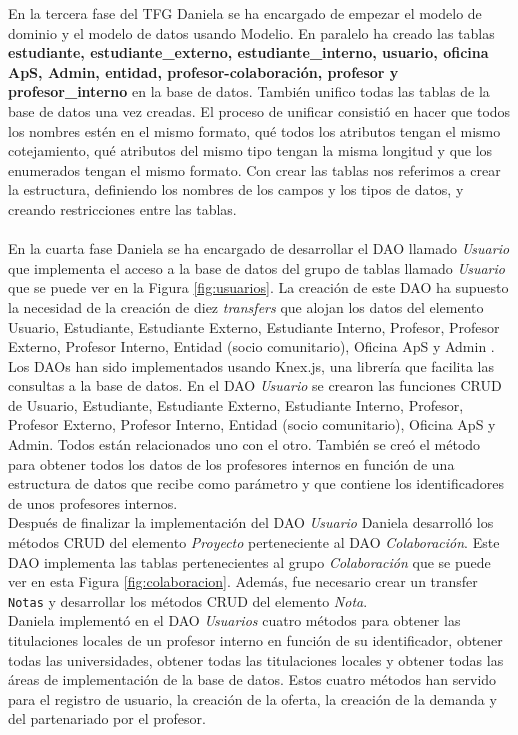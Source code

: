 \documentclass[11pt]{book}
\begin{document}
En la tercera fase del TFG Daniela se ha encargado de empezar el modelo de dominio y el modelo de datos usando Modelio. En paralelo ha creado las tablas \textbf{estudiante, estudiante\_externo, estudiante\_interno, usuario, oficina ApS, Admin, entidad, profesor-colaboración, profesor y profesor\_interno} en la base de datos. También unifico todas las tablas de la base de datos una vez creadas. El proceso de unificar consistió en hacer que todos los nombres estén en el mismo formato, qué todos los atributos tengan el mismo cotejamiento, qué atributos del mismo tipo tengan la misma longitud y que los enumerados tengan el mismo formato. Con crear las tablas nos referimos a crear la estructura, definiendo los nombres de los campos y los tipos de datos, y creando restricciones entre las tablas.\\\\
En la cuarta fase Daniela se ha encargado de desarrollar el DAO llamado \textit{Usuario} que implementa el acceso a la base de datos del grupo de tablas llamado \textit{Usuario} que se puede ver en la Figura \ref{fig:usuarios}. La creación de este DAO ha supuesto la necesidad de la creación de diez \textit{transfers} que alojan los datos del elemento Usuario, Estudiante, Estudiante Externo, Estudiante Interno, Profesor, Profesor Externo, Profesor Interno, Entidad (socio comunitario), Oficina ApS y Admin . Los DAOs han sido implementados usando Knex.js, una librería que facilita las consultas a la base de datos. En el DAO \textit{Usuario} se crearon las funciones CRUD de Usuario, Estudiante, Estudiante Externo, Estudiante Interno, Profesor, Profesor Externo, Profesor Interno, Entidad (socio comunitario), Oficina ApS y Admin. Todos están relacionados uno con el otro. También se creó el método para obtener todos los datos de los profesores internos en función de una estructura de datos que recibe como parámetro y que contiene los identificadores de unos profesores internos.\\
Después de finalizar la implementación del DAO \textit{Usuario} Daniela desarrolló los métodos CRUD del elemento \textit{Proyecto} perteneciente al DAO \textit{Colaboración}. Este DAO implementa las tablas pertenecientes al grupo \textit{Colaboración} que se puede ver en esta Figura \ref{fig:colaboracion}. Además, fue necesario crear un transfer \texttt{Notas} y desarrollar los métodos CRUD del elemento \textit{Nota}.\\
 Daniela implementó en el DAO \textit{Usuarios} cuatro métodos para obtener las titulaciones locales de un profesor interno en función de su identificador, obtener todas las universidades, obtener todas las titulaciones locales y obtener todas las áreas de implementación de la base de datos. Estos cuatro métodos han servido para el registro de usuario, la creación de la oferta, la creación de la demanda y del partenariado por el profesor.\\
\end{document}

